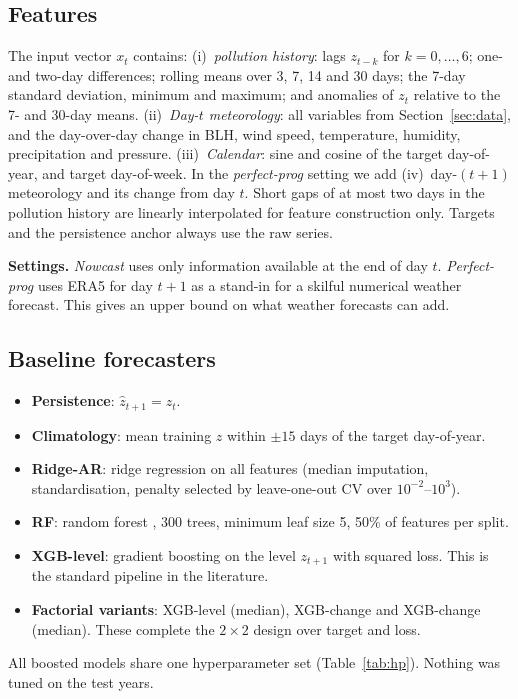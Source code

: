 \documentclass[conference]{IEEEtran}
\begin{document}
\subsection{Features}
The input vector $x_t$ contains:
(i)~\emph{pollution history}: lags $z_{t-k}$ for $k=0,\dots,6$; one- and two-day differences;
rolling means over 3, 7, 14 and 30 days; the 7-day standard deviation, minimum and maximum; and
anomalies of $z_t$ relative to the 7- and 30-day means.
(ii)~\emph{Day-$t$ meteorology}: all variables from Section~\ref{sec:data}, and the
day-over-day change in BLH, wind speed, temperature, humidity, precipitation and pressure.
(iii)~\emph{Calendar}: sine and cosine of the target day-of-year, and target day-of-week.
In the \emph{perfect-prog} setting we add (iv)~day-$(t{+}1)$ meteorology and its change from
day $t$. Short gaps of at most two days in the pollution history are linearly interpolated for
feature construction only. Targets and the persistence anchor always use the raw series.

\textbf{Settings.} \emph{Nowcast} uses only information available at the end of day
$t$. \emph{Perfect-prog} uses ERA5 for day $t{+}1$ as a stand-in for a skilful
numerical weather forecast. This gives an upper bound on what weather forecasts can add.

\subsection{Baseline forecasters}
\begin{itemize}
\item \textbf{Persistence}: $\hat z_{t+1}=z_t$.
\item \textbf{Climatology}: mean training $z$ within $\pm15$ days of the target
day-of-year.
\item \textbf{Ridge-AR}: ridge regression on all features (median imputation,
standardisation, penalty selected by leave-one-out CV over $10^{-2}$--$10^{3}$).
\item \textbf{RF}: random forest \cite{breiman2001}, 300 trees, minimum leaf size 5,
50\% of features per split.
\item \textbf{XGB-level}: gradient boosting \cite{chen2016} on the level $z_{t+1}$
with squared loss. This is the standard pipeline in the literature.
\item \textbf{Factorial variants}: XGB-level (median), XGB-change and XGB-change
(median). These complete the $2\times2$ design over target and loss.
\end{itemize}
All boosted models share one hyperparameter set (Table~\ref{tab:hp}). Nothing was tuned on the
test years.
\end{document}

